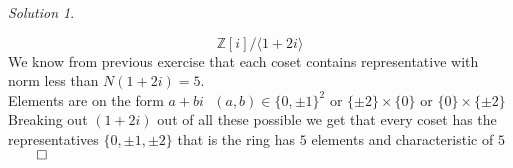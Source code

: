 \documentclass[a4paper,twoside=false,abstract=false,numbers=noenddot,
titlepage=false,headings=small,parskip=half,version=last]{scrartcl}
\theoremstyle{definition}
\theoremstyle{remark}
\newtheorem*{solution}{Solution}
\newcommand{\ZZ}{\ensuremath{\mathbb{Z}}}
\begin{document}
\begin{solution}
\begin{enumerate}[a)]
\begin{enumerate}[i.]
\begin{equation}
                    \ZZ\left[i\right]/\langle1+2i\rangle
                \end{equation}
                We know from previous exercise that each coset contains
                representative with norm less than $N(1+2i)=5$.\\
                Elements are on the form $a+bi~~~(a,b)\in\{0,\pm 1\}^2$ 
                or $\{\pm 2\}\times\{0\}$ or $\{0\}\times\{\pm 2\}$
                Breaking out $(1+2i)$ out of all these possible we get that
                every coset has the representatives $\{0,\pm 1,\pm 2\}$ that is
                the ring has $5$ elements and characteristic of $5$ $\qed$
        \end{enumerate}

\end{enumerate}

\end{solution}

\end{document}
